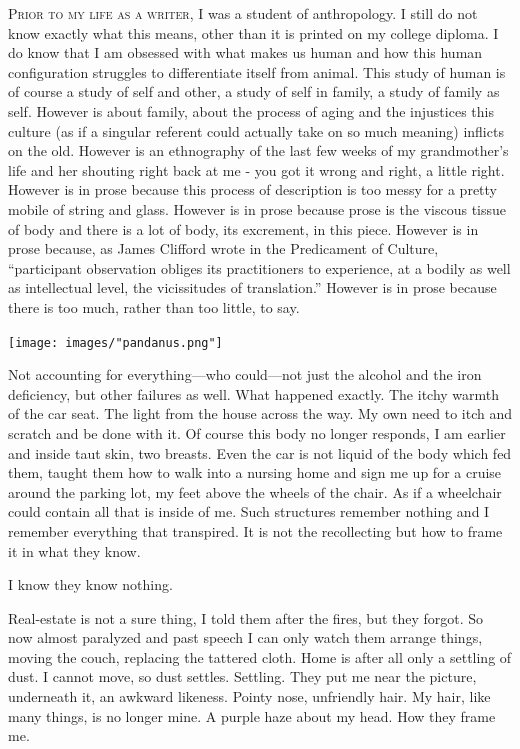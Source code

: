 \documentclass[
]{memoir}
\begin{document}
\lettrine[lines=3, findent=0em, nindent=0.1em, lhang=0]{P}{rior to my life as a writer,}
I was a student of anthropology. I still do not know exactly what this
means, other than it is printed on my college diploma. I do know that I
am obsessed with what makes us human and how this human configuration
struggles to differentiate itself from animal. This study of human is of
course a study of self and other, a study of self in family, a study of
family as self. However is about family, about the process of aging and
the injustices this culture (as if a singular referent could actually
take on so much meaning) inflicts on the old. However is an ethnography
of the last few weeks of my grandmother's life and her shouting right
back at me - you got it wrong and right, a little right. However is in
prose because this process of description is too messy for a pretty
mobile of string and glass. However is in prose because prose is the
viscous tissue of body and there is a lot of body, its excrement, in
this piece. However is in prose because, as James Clifford wrote in the
Predicament of Culture, ``participant observation obliges its
practitioners to experience, at a bodily as well as intellectual level,
the vicissitudes of translation.'' However is in prose because there is
too much, rather than too little, to say.

\begin{center}\texttt{[image: images/"pandanus.png"]}\end{center}

Not accounting for everything---who could---not just the alcohol and the
iron deficiency, but other failures as well. What happened exactly. The
itchy warmth of the car seat. The light from the house across the way.
My own need to itch and scratch and be done with it. Of course this body
no longer responds, I am earlier and inside taut skin, two breasts. Even
the car is not liquid of the body which fed them, taught them how to
walk into a nursing home and sign me up for a cruise around the parking
lot, my feet above the wheels of the chair. As if a wheelchair could
contain all that is inside of me. Such structures remember nothing and I
remember everything that transpired. It is not the recollecting but how
to frame it in what they know.

I know they know nothing.

Real-estate is not a sure thing, I told them after the fires, but they
forgot. So now almost paralyzed and past speech I can only watch them
arrange things, moving the couch, replacing the tattered cloth. Home is
after all only a settling of dust. I cannot move, so dust settles.
Settling. They put me near the picture, underneath it, an awkward
likeness. Pointy nose, unfriendly hair. My hair, like many things, is no
longer mine. A purple haze about my head. How they frame me.
\end{document}
